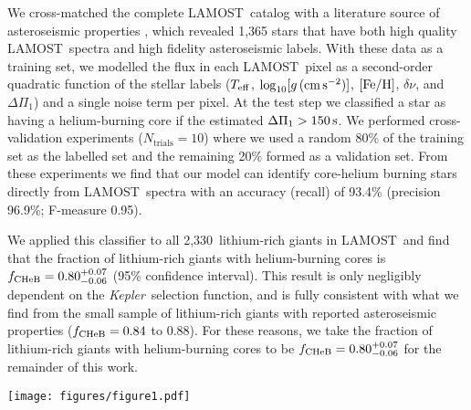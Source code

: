 \documentclass[twocolumn]{aastex62}
\newcommand{\SampleSize}{2,330}
\newcommand\lamost{LAMOST}
\newcommand{\project}[1]{\emph{#1}}
\newcommand{\gaia}{\project{Gaia}}
\newcommand{\kepler}{\project{Kepler}}
\newcommand{\logg}{\log_{10}[g\,({\rm cm\,s}^{-2})]}
\begin{document}
We cross-matched the complete \lamost\ catalog with a literature source of asteroseismic
properties \citep[$\Delta\nu$, $\Delta\Pi_1$;][]{Vrard_2016}, which revealed 1,365 stars that 
have both high quality \lamost\ spectra and high fidelity asteroseismic labels. With these 
data as a training set, we modelled the flux in each \lamost\ pixel as a second-order quadratic function
of the stellar labels ($T_{\rm eff}$, $\logg$, $[{\rm Fe}/{\rm H}]$, $\delta\nu$, and $\Delta\Pi_1$)
and a single noise term per pixel. At the test step we classified a star as having a helium-burning core if 
the estimated $\Delta\Pi_1 > 150\,{\rm s}$. We performed cross-validation experiments ($N_\textrm{trials} = 10$) 
where we used a random 80\% of the training set as the labelled set and the remaining 20\% formed as a validation 
set. From these experiments we find that our model can identify core-helium burning stars directly
from \lamost\ spectra with an accuracy (recall) of 93.4\% (precision 96.9\%; F-measure 0.95). 

We applied this classifier to all \SampleSize\ lithium-rich giants in \lamost\ and find that the
fraction of lithium-rich giants with helium-burning cores is $f_{\rm CHeB} = 0.80^{+0.07}_{-0.06}$ 
(95\% confidence interval). This result is only negligibly dependent on the \kepler\ selection function, and is fully consistent with what we find from the small sample of lithium-rich giants 
with reported asteroseismic properties ($f_{\rm CHeB} = 0.84$ to $0.88$). For these reasons, 
we take the fraction of lithium-rich giants with helium-burning cores to be 
$f_{\rm CHeB} = 0.80^{+0.07}_{-0.06}$ for the remainder of this work.


\begin{figure*}
	\texttt{[image: figures/figure1.pdf]}
	\caption{
		{Most lithium-rich giants have helium-burning cores.}
		\textbf{a.} Stellar parameters for all giants in \lamost\ (shown as logarithmic density in grey) and \SampleSize\ lithium-rich giants coloured by logarithmic density.
		\textbf{b.} Infrared colour and absolute magnitude for 240 lithium-rich giants
		with \gaia\ parallaxes. The density colour scale in panel (b) is matched to panel (a).
		The entire \gaia--TGAS sample is shown in grey \citep{Gaia-Collaboration_2018,Anderson_2018}.
		\textbf{c.} Asteroseismic period spacings for lithium-rich giants in the
		\kepler\ field.  Marker shapes (circles \citep{Mosser_2012}, squares \citep{Stello_2013} and triangles \citep{Vrard_2016}) indicate the literature source. For context, we show 
		asteroseismic properties of typical giant stars in grey \citep{Mosser_2012}.}
	\label{fig:figure1}
\end{figure*}
\end{document}

